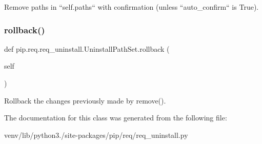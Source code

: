 \begin{DoxyVerb}Remove paths in ``self.paths`` with confirmation (unless
``auto_confirm`` is True).\end{DoxyVerb}
 \mbox{\label{classpip_1_1req_1_1req__uninstall_1_1_uninstall_path_set_a127cedc2e28d75e6e66e240e7be39500}} 
\subsubsection{\texorpdfstring{rollback()}{rollback()}}
{\footnotesize\ttfamily def pip.\+req.\+req\+\_\+uninstall.\+Uninstall\+Path\+Set.\+rollback (\begin{DoxyParamCaption}\item[{}]{self }\end{DoxyParamCaption})}

\begin{DoxyVerb}Rollback the changes previously made by remove().\end{DoxyVerb}
 

The documentation for this class was generated from the following file\+:\begin{DoxyCompactItemize}
\item 
venv/lib/python3./site-\/packages/pip/req/req\+\_\+uninstall.\+py\end{DoxyCompactItemize}
